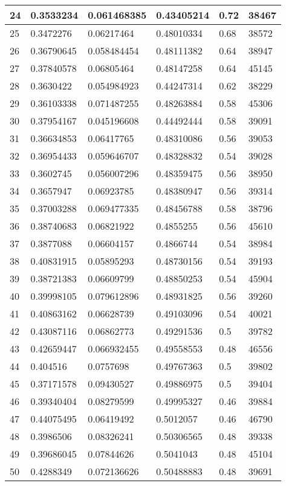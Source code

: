 \begin{longtable}{|l|l|l|l|l|l|}
24 & 0.3533234 & 0.061468385 & 0.43405214 & 0.72 & 38467 \\ \hline 
25 & 0.3472276 & 0.06217464 & 0.48010334 & 0.68 & 38572 \\ \hline 
26 & 0.36790645 & 0.058484454 & 0.48111382 & 0.64 & 38947 \\ \hline 
27 & 0.37840578 & 0.06805464 & 0.48147258 & 0.64 & 45145 \\ \hline 
28 & 0.3630422 & 0.054984923 & 0.44247314 & 0.62 & 38229 \\ \hline 
29 & 0.36103338 & 0.071487255 & 0.48263884 & 0.58 & 45306 \\ \hline 
30 & 0.37954167 & 0.045196608 & 0.44492444 & 0.58 & 39091 \\ \hline 
31 & 0.36634853 & 0.06417765 & 0.48310086 & 0.56 & 39053 \\ \hline 
32 & 0.36954433 & 0.059646707 & 0.48328832 & 0.54 & 39028 \\ \hline 
33 & 0.3602745 & 0.056007296 & 0.48359475 & 0.56 & 38950 \\ \hline 
34 & 0.3657947 & 0.06923785 & 0.48380947 & 0.56 & 39314 \\ \hline 
35 & 0.37003288 & 0.069477335 & 0.48456788 & 0.58 & 38796 \\ \hline 
36 & 0.38740683 & 0.06821922 & 0.4855255 & 0.56 & 45610 \\ \hline 
37 & 0.3877088 & 0.06604157 & 0.4866744 & 0.54 & 38984 \\ \hline 
38 & 0.40831915 & 0.05895293 & 0.48730156 & 0.54 & 39193 \\ \hline 
39 & 0.38721383 & 0.06609799 & 0.48850253 & 0.54 & 45904 \\ \hline 
40 & 0.39998105 & 0.079612896 & 0.48931825 & 0.56 & 39260 \\ \hline 
41 & 0.40863162 & 0.06628739 & 0.49103096 & 0.54 & 40021 \\ \hline 
42 & 0.43087116 & 0.06862773 & 0.49291536 & 0.5 & 39782 \\ \hline 
43 & 0.42659447 & 0.066932455 & 0.49558553 & 0.48 & 46556 \\ \hline 
44 & 0.404516 & 0.0757698 & 0.49767363 & 0.5 & 39802 \\ \hline 
45 & 0.37171578 & 0.09430527 & 0.49886975 & 0.5 & 39404 \\ \hline 
46 & 0.39340404 & 0.08279599 & 0.49995327 & 0.46 & 39884 \\ \hline 
47 & 0.44075495 & 0.06419492 & 0.5012057 & 0.46 & 46790 \\ \hline 
48 & 0.3986506 & 0.08326241 & 0.50306565 & 0.48 & 39338 \\ \hline 
49 & 0.39686045 & 0.07844626 & 0.5041043 & 0.48 & 45104 \\ \hline 
50 & 0.4288349 & 0.072136626 & 0.50488883 & 0.48 & 39691 \\ \hline 
\end{longtable}